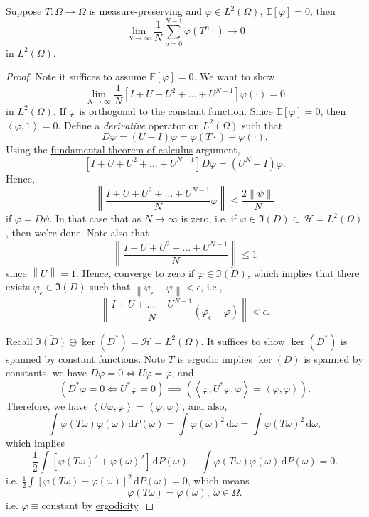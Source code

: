 \begin{proposition}
	Suppose \(T\colon \Omega \to \Omega\) is \hyperref[def:measure-preserving]{measure-preserving} and \(\varphi \in L^2(\Omega)\), \(\mathbb{E}\left[\varphi \right] = 0\), then
	\[
		\lim\limits_{N \to \infty} \frac{1}{N} \sum_{n = 0}^{N - 1} \varphi(T^n \cdot) \to 0
	\]
	in \(L^2(\Omega)\).
\end{proposition}
\begin{proof}
	Note it suffices to assume \(\mathbb{E}\left[\varphi \right] = 0\). We want to show
	\[
		\lim_{N \to \infty} \frac{1}{N} [I + U + U^2 + \ldots + U^{N-1}] \varphi(\cdot) = 0
	\]
	in \(L^2(\Omega)\). If \(\varphi\) is \hyperref[def:orthogonal]{orthogonal} to the constant function. Since \(\mathbb{E}\left[\varphi \right] = 0\), then \(\left\langle \varphi, 1 \right\rangle  = 0\). Define a \emph{derivative} operator on \(L^2(\Omega)\) such that
	\[
		D \varphi = (U - I) \varphi = \varphi(T \cdot) - \varphi(\cdot).
	\]
	Using the \href{https://en.wikipedia.org/wiki/Fundamental_theorem_of_calculus}{fundamental theorem of calculus} argument,
	\[
		[I + U + U^2 + \ldots + U^{N-1}] D\varphi = (U^N - I) \varphi.
	\]
	Hence,
	\[
		\left\lVert \frac{I + U + U^2 + \ldots + U^{N-1}}{N} \varphi\right\rVert \leq \frac{2 \left\lVert \psi\right\rVert }{N}
	\]
	if \(\varphi = D \psi\). In that case that as \(N \to \infty\) is zero, i.e. if \(\varphi \in \Im(D) \subset \mathcal{H} = L^2(\Omega)\), then we're done. Note also that
	\[
		\left\lVert \frac{I + U + U^2 + \ldots + U^{N-1}}{N}\right\rVert \leq 1
	\]
	since \(\left\lVert U\right\rVert = 1\). Hence, converge to zero if \(\varphi \in \overline{\Im(D)}\), which implies that there exists \(\varphi _\epsilon \in \Im (D)\) such that \(\left\lVert \varphi _\epsilon - \varphi \right\rVert < \epsilon \), i.e.,
	\[
		\left\lVert \frac{I + U + \ldots + U^{N-1}}{N} (\varphi_\epsilon - \varphi)\right\rVert  < \epsilon.
	\]

	Recall \(\overline{\Im(D)} \oplus \ker(D^{\ast}) = \mathcal{H} = L^2(\Omega)\). It suffices to show \(\ker(D^{\ast})\) is spanned by constant functions. Note \(T\) is \hyperref[def:ergodic-transformation]{ergodic} implies \(\ker(D)\) is spanned by constants, we have \(D \varphi = 0 \Leftrightarrow U\varphi = \varphi\), and
	\[
		(D^{\ast} \varphi = 0 \Leftrightarrow U^{\ast} \varphi = 0) \implies (\left\langle \varphi, U^{\ast} \varphi, \varphi \right\rangle  = \left\langle \varphi, \varphi \right\rangle ).
	\]
	Therefore, we have \(\left\langle U \varphi, \varphi \right\rangle = \left\langle \varphi, \varphi \right\rangle\), and also,
	\[
		\int \varphi(T \omega) \varphi(\omega) \,\mathrm{d} P(\omega)
		=\int \varphi(\omega)^2 \,\mathrm{d} \omega
		= \int \varphi(T \omega)^2 \,\mathrm{d} \omega,
	\]
	which implies
	\[
		\frac{1}{2} \int [\varphi(T \omega)^2 + \varphi(\omega)^2] \,\mathrm{d} P(\omega) - \int \varphi(T \omega) \varphi(\omega) \,\mathrm{d} P(\omega) = 0.
	\]
	i.e. \(\frac{1}{2} \int[\varphi(T \omega) - \varphi(\omega)]^2 \,\mathrm{d} P(\omega) = 0\), which means
	\[
		\varphi(T \omega) = \varphi(\omega),\ \omega \in \Omega.
	\]
	i.e. \(\varphi \equiv \text{constant}\) by \hyperref[def:ergodic-transformation]{ergodicity}.
\end{proof}

